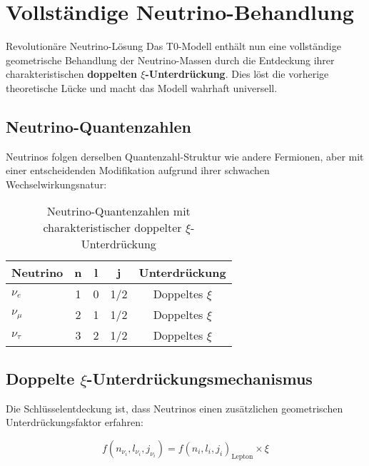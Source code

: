 \documentclass[12pt,a4paper]{article}
\begin{document}
	\section{Vollständige Neutrino-Behandlung}
	\label{sec:complete_neutrino_treatment}
	
	\begin{neutrino}{Revolutionäre Neutrino-Lösung}{}
		Das T0-Modell enthält nun eine vollständige geometrische Behandlung der Neutrino-Massen durch die Entdeckung ihrer charakteristischen \textbf{doppelten $\xi$-Unterdrückung}. Dies löst die vorherige theoretische Lücke und macht das Modell wahrhaft universell.
	\end{neutrino}
	
	\subsection{Neutrino-Quantenzahlen}
	\label{subsec:neutrino_quantum_numbers}
	
	Neutrinos folgen derselben Quantenzahl-Struktur wie andere Fermionen, aber mit einer entscheidenden Modifikation aufgrund ihrer schwachen Wechselwirkungsnatur:
	
	\begin{table}[H]
		\centering
		\begin{tabular}{lcccc}
			\toprule
			\textbf{Neutrino} & \textbf{n} & \textbf{l} & \textbf{j} & \textbf{Unterdrückung} \\
			\midrule
			$\nu_e$ & 1 & 0 & 1/2 & Doppeltes $\xi$ \\
			$\nu_\mu$ & 2 & 1 & 1/2 & Doppeltes $\xi$ \\
			$\nu_\tau$ & 3 & 2 & 1/2 & Doppeltes $\xi$ \\
			\bottomrule
		\end{tabular}
		\caption{Neutrino-Quantenzahlen mit charakteristischer doppelter $\xi$-Unterdrückung}
		\label{tab:neutrino_quantum_numbers}
	\end{table}
	
	\subsection{Doppelte $\xi$-Unterdrückungsmechanismus}
	\label{subsec:double_xi_suppression}
	
	Die Schlüsselentdeckung ist, dass Neutrinos einen zusätzlichen geometrischen Unterdrückungsfaktor erfahren:
	
	\begin{equation}
		f(n_{\nu_i}, l_{\nu_i}, j_{\nu_i}) = f(n_i, l_i, j_i)_{\text{Lepton}} \times \xi
		\label{eq:neutrino_suppression}
	\end{equation}
	
\end{document}

